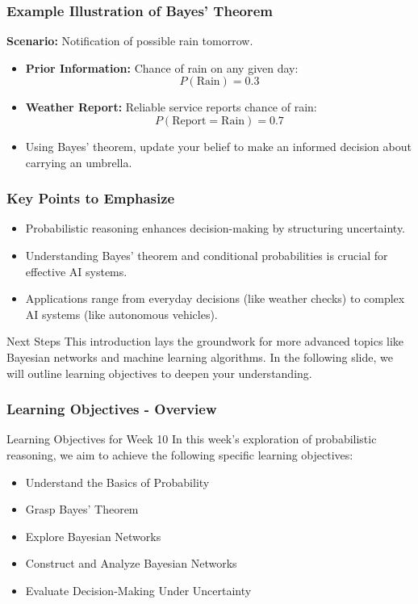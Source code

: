 \documentclass[aspectratio=169]{beamer}
\begin{document}
\begin{frame}[fragile]
  \frametitle{Example Illustration of Bayes' Theorem}
  \textbf{Scenario:} Notification of possible rain tomorrow.
  
  \begin{itemize}
    \item \textbf{Prior Information:} Chance of rain on any given day: 
    \[
    P(\text{Rain}) = 0.3
    \]
    \item \textbf{Weather Report:} Reliable service reports chance of rain:
    \[
    P(\text{Report} = \text{Rain}) = 0.7
    \]
    \item Using Bayes' theorem, update your belief to make an informed decision about carrying an umbrella.
  \end{itemize}
\end{frame}

\begin{frame}[fragile]
  \frametitle{Key Points to Emphasize}
  \begin{itemize}
    \item Probabilistic reasoning enhances decision-making by structuring uncertainty.
    \item Understanding Bayes' theorem and conditional probabilities is crucial for effective AI systems.
    \item Applications range from everyday decisions (like weather checks) to complex AI systems (like autonomous vehicles).
  \end{itemize}

  \begin{block}{Next Steps}
    This introduction lays the groundwork for more advanced topics like Bayesian networks and machine learning algorithms. In the following slide, we will outline learning objectives to deepen your understanding.
  \end{block}
\end{frame}

\begin{frame}[fragile]
    \frametitle{Learning Objectives - Overview}
    \begin{block}{Learning Objectives for Week 10}
        In this week’s exploration of probabilistic reasoning, we aim to achieve the following specific learning objectives:
    \end{block}
    \begin{itemize}
        \item Understand the Basics of Probability
        \item Grasp Bayes' Theorem
        \item Explore Bayesian Networks
        \item Construct and Analyze Bayesian Networks
        \item Evaluate Decision-Making Under Uncertainty
    \end{itemize}
\end{frame}
\end{document}
